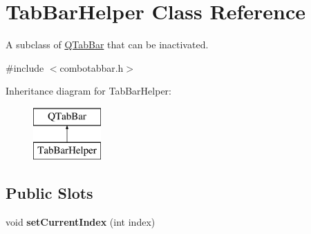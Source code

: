 \hypertarget{class_tab_bar_helper}{
\section{TabBarHelper Class Reference}
\label{class_tab_bar_helper}
}


A subclass of \hyperlink{class_q_tab_bar}{QTabBar} that can be inactivated.  




{\ttfamily \#include $<$combotabbar.h$>$}

Inheritance diagram for TabBarHelper:\begin{figure}[H]
\begin{center}
\leavevmode
\includegraphics[height=2cm]{class_tab_bar_helper}
\end{center}
\end{figure}
\subsection*{Public Slots}
\begin{DoxyCompactItemize}
\item 
\hypertarget{class_tab_bar_helper_aecf7527d83bce94d0f3b6c985861b003}{
void {\bfseries setCurrentIndex} (int index)}
\label{class_tab_bar_helper_aecf7527d83bce94d0f3b6c985861b003}

\end{DoxyCompactItemize}
